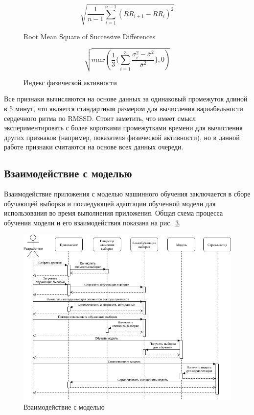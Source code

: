 \documentclass[14pt]{matmex-diploma-custom}
\begin{document}
\begin{figure}[ht]
  \centering
  \begin{equation}
    \sqrt{\frac{1}{n-1}\sum_{i=1}^{n-1}(RR_{i+1} - RR_{i})^2}
  \end{equation}
  \caption{Root Mean Square of Successive Differences}
  \label{fig:rmssd}
\end{figure}

\begin{figure}[ht]
  \centering
  \begin{equation}
    \sqrt{max(\frac{1}{3}\{\sum_{i=1}^3\frac{\sigma_i^2 - \overline{\sigma}^2}{\overline{\sigma}^2}\}, 0)}
  \end{equation}
  \caption{Индекс физической активности}
  \label{fig:activity_index}
\end{figure}


Все признаки вычисляются на основе данных за одинаковый промежуток длиной в 5
минут, что является стандартным размером для вычисления вариабельности
сердечного ритма по RMSSD. Стоит заметить, что имеет смысл экспериментировать с
более короткими промежутками времени для вычисления других признаков (например,
показателя физической активности), но в данной работе признаки считаются на
основе всех данных очереди.

\subsection{Взаимодействие с моделью}
Взаимодействие приложения с моделью машинного обучения заключается в сборе
обучающей выборки и последующей адаптации обученной модели для использования во
время выполнения приложения. Общая схема процесса обучения модели и его
взаимодействия показана на рис.~\ref{fig:model_interaction}.

\begin{figure}[ht]
  \centering \includegraphics[width=\textwidth]{images/model_interaction.png}
  \caption{Взаимодействие с моделью}
  \label{fig:model_interaction}
\end{figure}
\end{document}
